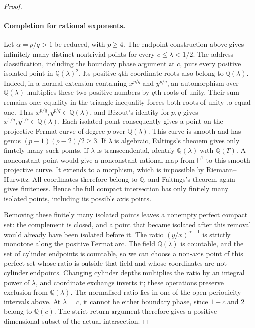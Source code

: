 \begin{proof}
\paragraph{Completion for rational exponents.}
Let $\alpha=p/q>1$ be reduced, with $p\ge4$. The endpoint construction
above gives infinitely many distinct nontrivial points for every
$c\le\lambda<1/2$. The address classification, including the boundary
phase argument at $c$, puts every positive isolated point in
$\mathbb Q(\lambda)^2$.
Its positive $q$th coordinate roots also belong to $\mathbb Q(\lambda)$.
Indeed, in a normal extension containing $x^{p/q}$ and $y^{p/q}$,
an automorphism over $\mathbb Q(\lambda)$ multiplies these two positive
numbers by $q$th roots of unity. Their sum remains one; equality in
the triangle inequality forces both roots of unity to equal one.
Thus $x^{p/q},y^{p/q}\in\mathbb Q(\lambda)$, and B\'ezout's identity
for $p,q$ gives $x^{1/q},y^{1/q}\in\mathbb Q(\lambda)$.
Each isolated point consequently gives a point on the projective
Fermat curve of degree $p$ over $\mathbb Q(\lambda)$. This curve is
smooth and has genus $(p-1)(p-2)/2\ge3$. If $\lambda$ is algebraic,
Faltings's theorem \cite{Faltings1983} gives only finitely many such
points. If $\lambda$ is transcendental, identify $\mathbb Q(\lambda)$
with $\mathbb Q(T)$. A nonconstant point would give a nonconstant
rational map from $\mathbb P^1$ to this smooth projective curve.
It extends to a morphism, which is impossible by Riemann--Hurwitz.
All coordinates therefore belong to $\mathbb Q$, and Faltings's
theorem again gives finiteness. Hence the full compact intersection
has only finitely many isolated points, including its possible axis
points.

Removing these finitely many isolated points leaves a nonempty perfect
compact set: the complement is closed, and a point that became isolated
after this removal would already have been isolated before it.
The ratio $(y/x)^{\alpha-1}$ is strictly monotone along
the positive Fermat arc. The field $\mathbb Q(\lambda)$ is countable,
and the set of cylinder endpoints is countable, so we can choose
a non-axis point of this perfect set whose ratio is
outside that field and whose coordinates are not cylinder endpoints.
Changing cylinder depths multiplies the ratio by an integral power of
$\lambda$, and coordinate exchange inverts it; these operations
preserve exclusion from $\mathbb Q(\lambda)$. The normalised ratio
lies in one of the open periodicity intervals above. At $\lambda=c$,
it cannot be either boundary phase, since $1+c$ and $2$ belong to
$\mathbb Q(c)$. The strict-return argument therefore gives a
positive-dimensional subset of the actual intersection.


\end{proof}
